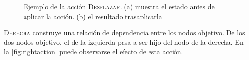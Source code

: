 \begin{figure}[ht]
  \centering
  \begin{subfigure}[b]{0.3\textwidth}
    \caption{}
  \end{subfigure}
  \qquad\qquad
  \begin{subfigure}[b]{0.3\textwidth}
    \caption{}
  \end{subfigure}
  \caption{Ejemplo de la acción \textsc{Desplazar}. (a) muestra el
    estado antes de aplicar la acción. (b) el resultado trasaplicarla}
  \label{fig:shiftaction}
\end{figure}
\textsc{Derecha} construye una relación de dependencia entre los nodos
objetivo. De los dos nodos objetivo, el de la izquierda pasa a ser hijo
del nodo de la derecha. En la \autoref{fig:rightaction} puede observarse el
efecto de esta acción.
